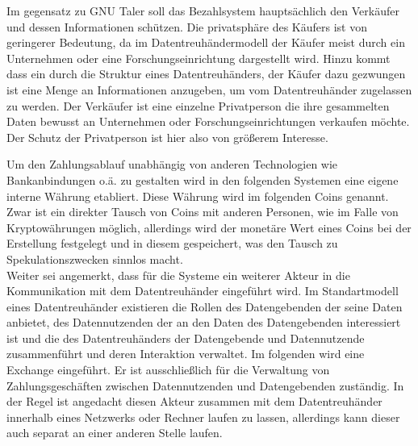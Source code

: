 \documentclass[11pt,a4paper]{scrreprt}
\begin{document}
Im gegensatz zu GNU Taler soll das Bezahlsystem hauptsächlich den Verkäufer und dessen Informationen schützen. Die privatsphäre des Käufers ist von geringerer Bedeutung, da im Datentreuhändermodell der Käufer meist durch ein Unternehmen oder eine Forschungseinrichtung dargestellt wird. Hinzu kommt dass ein durch die Struktur eines Datentreuhänders, der Käufer dazu gezwungen ist eine Menge an Informationen anzugeben, um vom Datentreuhänder zugelassen zu werden. Der Verkäufer ist eine einzelne Privatperson die ihre gesammelten Daten bewusst an Unternehmen oder Forschungseinrichtungen verkaufen möchte. Der Schutz der Privatperson ist hier also von größerem Interesse.

Um den Zahlungsablauf unabhängig von anderen Technologien wie Bankanbindungen o.ä. zu gestalten wird in den folgenden Systemen eine eigene interne Währung etabliert. Diese Währung wird im folgenden Coins genannt. Zwar ist ein direkter Tausch von Coins mit anderen Personen, wie im Falle von Kryptowährungen möglich, allerdings wird der monetäre Wert eines Coins bei der Erstellung festgelegt und in diesem gespeichert, was den Tausch zu Spekulationszwecken sinnlos macht.\\
Weiter sei angemerkt, dass für die Systeme ein weiterer Akteur in die Kommunikation mit dem Datentreuhänder eingeführt wird. Im Standartmodell eines Datentreuhänder existieren die Rollen des Datengebenden der seine Daten anbietet, des Datennutzenden der an den Daten des Datengebenden interessiert ist und die des Datentreuhänders der Datengebende und Datennutzende zusammenführt und deren Interaktion verwaltet. Im folgenden wird eine Exchange eingeführt. Er ist ausschließlich für die Verwaltung von Zahlungsgeschäften zwischen Datennutzenden und Datengebenden zuständig. In der Regel ist angedacht diesen Akteur zusammen mit dem Datentreuhänder innerhalb eines Netzwerks oder Rechner laufen zu lassen, allerdings kann dieser auch separat an einer anderen Stelle laufen.\\
\end{document}
